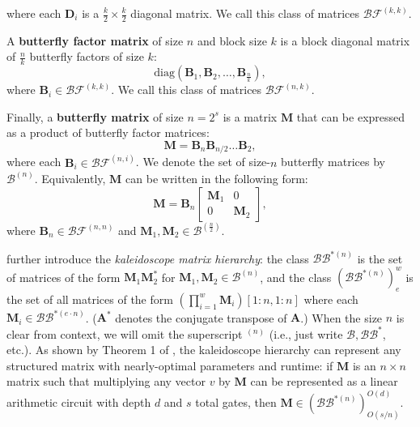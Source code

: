     \)
    where each $\mathbf{D}_i$ is a $\frac{k}{2} \times \frac{k}{2}$ diagonal matrix. We call this class of matrices $\mathcal{B}\mathcal{F}^{(k,k)}$.

 A \textbf{butterfly factor matrix} of size $n$ and block size $k$ is a block diagonal matrix of $\frac{n}{k}$ butterfly factors of size $k$:
     \[
        \mathrm{diag}\left(\mathbf{B}_1, \mathbf{B}_2, \hdots, \mathbf{B}_\frac{n}{k} \right),
     \]
      where $\mathbf{B}_i \in \mathcal{B}\mathcal{F}^{(k,k)}$. We call this class of matrices $\mathcal{B}\mathcal{F}^{(n,k)}$.

    Finally, a \textbf{butterfly matrix} of size $n = 2^s$ is a matrix $\mathbf{M}$ that can be expressed as a product of butterfly factor matrices:
    \[
        \mathbf{M} = \mathbf{B}_n \mathbf{B}_{n/2} \hdots \mathbf{B}_2,
    \]
    where each $\mathbf{B}_i \in \mathcal{B}\mathcal{F}^{(n, i)}$. We denote the set of size-$n$ butterfly matrices by $\mathcal{B}^{(n)}$.
    Equivalently, $\mathbf{M}$ can be written in the following form:
    \[
         \mathbf{M} = \mathbf{B}_n

\begin{bmatrix}
            \mathbf{M}_1 & 0 \\
            0 & \mathbf{M}_2
         \end{bmatrix}

,
    \]
    where $\mathbf{B}_n \in \mathcal{B}\mathcal{F}^{(n,n)}$ and $\mathbf{M}_1, \mathbf{M}_2 \in \mathcal{B}^{(\frac{n}{2})}$.

    \citet{dao2020kaleidoscope} further introduce the \emph{kaleidoscope matrix hierarchy}: the class $\mathcal{B}\mathcal{B}^{*(n)}$ is the set of matrices of the form $\mathbf{M}_1\mathbf{M}_2^*$ for $\mathbf{M}_1,\mathbf{M}_2 \in \mathcal{B}^{(n)}$, and the class $(\mathcal{B}\mathcal{B}^{*(n)})^w_e$ is the set of all matrices of the form $\left( \prod\limits_{i=1}^{w} \mathbf{M}_i \right)[1{:}n, 1{:}n]$ where each $\mathbf{M}_i \in \mathcal{B}\mathcal{B}^{*(e\cdot n)}$. ($\mathbf{A}^*$ denotes the conjugate transpose of $\mathbf{A}$.)
    When the size $n$ is clear from context, we will omit the superscript $^{(n)}$ (i.e., just write $\mathcal{B},\mathcal{B}\mathcal{B}^*$, etc.). As shown by Theorem 1 of \citet{dao2020kaleidoscope}, the kaleidoscope hierarchy can represent any structured matrix with nearly-optimal parameters and runtime: if $\mathbf{M}$ is an $n \times n$ matrix such that multiplying any vector $v$ by $\mathbf{M}$ can be represented as a linear arithmetic circuit with depth $d$ and $s$ total gates, then $\mathbf{M} \in (\mathcal{B}\mathcal{B}^{*(n)})^{O(d)}_{O(s/n)}$. 

